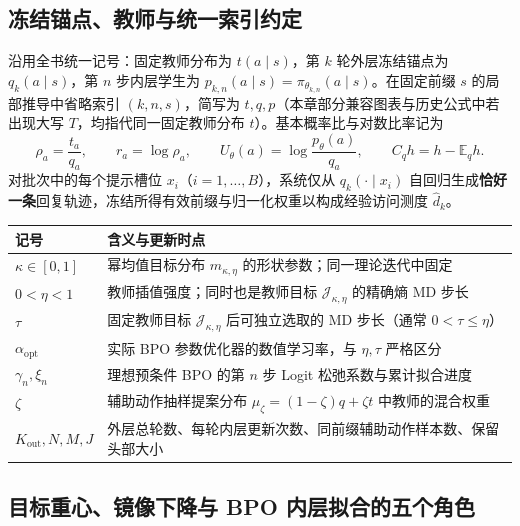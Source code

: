 \documentclass[lang=cn,scheme=chinese,openany]{elegantbook}
\newcommand{\E}{\mathbb E}
\begin{document}
\subsection{冻结锚点、教师与统一索引约定}

沿用全书统一记号：固定教师分布为 $t(a\mid s)$，第 $k$ 轮外层冻结锚点为 $q_k(a\mid s)$，第 $n$ 步内层学生为 $p_{k,n}(a\mid s)=\pi_{\theta_{k,n}}(a\mid s)$。在固定前缀 $s$ 的局部推导中省略索引 $(k,n,s)$，简写为 $t,q,p$（本章部分兼容图表与历史公式中若出现大写 $T$，均指代同一固定教师分布 $t$）。基本概率比与对数比率记为
\begin{equation}
 \rho_a=\frac{t_a}{q_a},\qquad r_a=\log\rho_a,\qquad
 U_\theta(a)=\log\frac{p_\theta(a)}{q_a},\qquad
 C_q h=h-\E_q h.
 \label{eq:power-chapter-ratios}
\end{equation}
对批次中的每个提示槽位 $x_i$（$i=1,\ldots,B$），系统仅从 $q_k(\cdot\mid x_i)$ 自回归生成\textbf{恰好一条}回复轨迹，冻结所得有效前缀与归一化权重以构成经验访问测度 $\widehat d_k$。

\begin{center}
\begin{tabular}{lp{108mm}}
\toprule
记号 & 含义与更新时点\\
\midrule
$\kappa\in[0,1]$ & 幂均值目标分布 $m_{\kappa,\eta}$ 的形状参数；同一理论迭代中固定\\
$0<\eta<1$ & 教师插值强度；同时也是教师目标 $\mathcal J_{\kappa,\eta}$ 的精确熵 MD 步长\\
$\tau$ & 固定教师目标 $\mathcal J_{\kappa,\eta}$ 后可独立选取的 MD 步长（通常 $0<\tau\le\eta$）\\
$\alpha_{\mathrm{opt}}$ & 实际 BPO 参数优化器的数值学习率，与 $\eta,\tau$ 严格区分\\
$\gamma_n,\xi_n$ & 理想预条件 BPO 的第 $n$ 步 Logit 松弛系数与累计拟合进度\\
$\zeta$ & 辅助动作抽样提案分布 $\mu_\zeta=(1-\zeta)q+\zeta t$ 中教师的混合权重\\
$K_{\mathrm{out}},N,M,J$ & 外层总轮数、每轮内层更新次数、同前缀辅助动作样本数、保留头部大小\\
\bottomrule
\end{tabular}
\end{center}

\subsection{目标重心、镜像下降与 BPO 内层拟合的五个角色}
\end{document}
